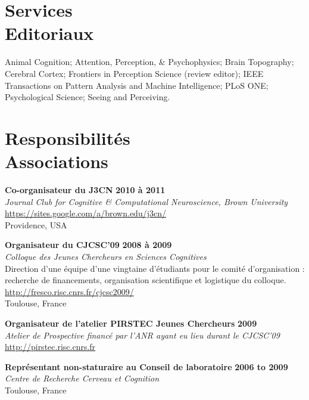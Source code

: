 \documentclass[margin,line]{resume}
\begin{document}
\begin{resume}
\newpage	


\vspace{3mm}
\section{\mysidestyle Services\\Editoriaux}
Animal Cognition; 
Attention, Perception, \& Psychophysics; 
Brain Topography;  
Cerebral Cortex; 
Frontiers in Perception Science (review editor); 
IEEE Transactions on Pattern Analysis and Machine Intelligence;
PLoS ONE; 
Psychological Science;
Seeing and Perceiving.


\vspace{3mm}
    \section{\mysidestyle Responsibilités\\ Associations}

	\textbf{Co-organisateur du J3CN} \hfill \textbf{2010 à 2011}\\
	\textsl{Journal Club for Cognitive \& Computational Neuroscience, Brown University}\\
	 \url{https://sites.google.com/a/brown.edu/j3cn/}\\
	Providence, USA	

	\textbf{Organisateur du CJCSC'09} \hfill \textbf{2008 à 2009}\\
	\textsl{Colloque des Jeunes Chercheurs en Sciences Cognitives}\\
	Direction d'une équipe d'une vingtaine d'étudiants pour le comité d'organisation : recherche de financements, organisation scientifique et logistique du colloque.\\
	 \url{http://fresco.risc.cnrs.fr/cjcsc2009/}\\
	Toulouse, France	

	\textbf{Organisateur de l'atelier PIRSTEC Jeunes Chercheurs} \hfill \textbf{2009}\\
	\textsl{Atelier de Prospective financé par l'ANR ayant eu lieu durant le CJCSC'09}\\
	\url{http://pirstec.risc.cnrs.fr}

	\textbf{Représentant non-staturaire au Conseil de laboratoire} \hfill \textbf{2006 to 2009}\\
	\textsl{Centre de Recherche Cerveau et Cognition}\\
	Toulouse, France	


\end{resume}
\end{document}
